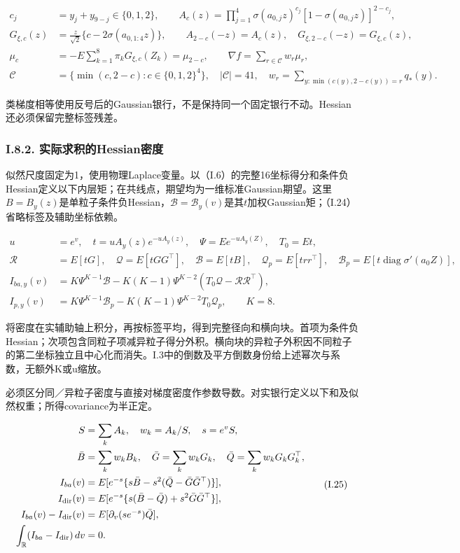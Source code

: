 \documentclass[11pt,a4paper]{article}
\begin{document}
\[
\begin{aligned}
c_j&=y_j+y_{9-j}\in\{0,1,2\},\qquad
A_c(z)=\prod_{j=1}^4\sigma(a_{0,j}z)^{c_j}[1-\sigma(a_{0,j}z)]^{2-c_j},\\
G_{\xi,c}(z)&=\frac z{\sqrt2}\{c-2\sigma(a_{0,1:4}z)\},\qquad
A_{2-c}(-z)=A_c(z),\quad G_{\xi,2-c}(-z)=G_{\xi,c}(z),\\
\mu_c&=-E\sum_{k=1}^8\pi_kG_{\xi,c}(Z_k)=\mu_{2-c},\qquad
\nabla f=\sum_{r\in\mathcal C}w_r\mu_r,\\
\mathcal C&=\{\min(c,2-c):c\in\{0,1,2\}^4\},\quad|\mathcal C|=41,\quad
w_r=\sum_{y:\min(c(y),2-c(y))=r}q_*(y).
\end{aligned}
\tag{I.23}
\]

类梯度相等使用反号后的Gaussian银行，不是保持同一个固定银行不动。Hessian还必须保留完整标签残差。

\subsubsection*{I.8.2.
实际求积的Hessian密度}\label{i.8.2.-ux5b9eux9645ux6c42ux79efux7684hessianux5bc6ux5ea6}

似然尺度固定为1，使用物理Laplace变量。以（I.6）的完整16坐标得分和条件负Hessian定义以下内层矩；在共线点，期望均为一维标准Gaussian期望。这里\(B=B_y(z)\)是单粒子条件负Hessian，\(\mathcal B=\mathcal B_y(v)\)是其\(t\)加权Gaussian矩；（I.24）省略标签及辅助坐标依赖。

\[
\begin{aligned}
u&=e^v,\quad t=uA_y(z)e^{-uA_y(z)},\quad\Psi=E e^{-uA_y(Z)},\quad T_0=Et,\\
\mathcal R&=E[tG],\quad\mathcal Q=E[tGG^\top],\quad\mathcal B=E[tB],\quad
\mathcal Q_p=E[trr^\top],\quad\mathcal B_p=E[t\operatorname{diag}\sigma'(a_0Z)],\\
I_{ba,y}(v)&=K\Psi^{K-1}\mathcal B-K(K-1)\Psi^{K-2}(T_0\mathcal Q-\mathcal R\mathcal R^\top),\\
I_{p,y}(v)&=K\Psi^{K-1}\mathcal B_p-K(K-1)\Psi^{K-2}T_0\mathcal Q_p,\qquad K=8.
\end{aligned}
\tag{I.24}
\]

将密度在实辅助轴上积分，再按标签平均，得到完整径向和横向块。首项为条件负Hessian；次项包含同粒子项减异粒子得分外积。横向块的异粒子外积因不同粒子的第二坐标独立且中心化而消失。I.3中的倒数及平方倒数身份给上述幂次与系数，无额外K或u缩放。

必须区分同／异粒子密度与直接对梯度密度作参数导数。对实银行定义以下和及似然权重；所得covariance为半正定。

\[
\begin{aligned}
S&=\sum_kA_k,\quad w_k=A_k/S,\quad s=e^vS,\\
\bar B&=\sum_kw_kB_k,\quad\bar G=\sum_kw_kG_k,\quad\bar Q=\sum_kw_kG_kG_k^\top,\\
I_{ba}(v)&=E[e^{-s}\{s\bar B-s^2(\bar Q-\bar G\bar G^\top)\}],\\
I_{\rm dir}(v)&=E[e^{-s}\{s(\bar B-\bar Q)+s^2\bar G\bar G^\top\}],\\
I_{ba}(v)-I_{\rm dir}(v)&=E[\partial_v(se^{-s})\bar Q],\\
\int_{\mathbb R}(I_{ba}-I_{\rm dir})\,dv&=0.
\end{aligned}
\tag{I.25}
\]
\end{document}
